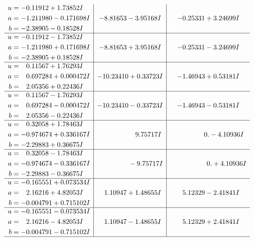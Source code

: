 \documentclass[1p]{elsarticle_modified}
\theoremstyle{definition}
\begin{document}
$$\begin{array}{c|c|c}
\begin{aligned}
u &= -0.11912 + 1.73852 I \\
a &= -1.211980 - 0.171698 I \\
b &= -2.38905 - 0.18528 I\end{aligned}
 & -8.81653 - 3.95168 I & -0.25331 + 3.24699 I \\ \hline\begin{aligned}
u &= -0.11912 - 1.73852 I \\
a &= -1.211980 + 0.171698 I \\
b &= -2.38905 + 0.18528 I\end{aligned}
 & -8.81653 + 3.95168 I & -0.25331 - 3.24699 I \\ \hline\begin{aligned}
u &= \phantom{-}0.11567 + 1.76293 I \\
a &= \phantom{-}0.697284 + 0.000472 I \\
b &= \phantom{-}2.05356 + 0.22436 I\end{aligned}
 & -10.23410 + 0.33723 I & -1.46943 + 0.53181 I \\ \hline\begin{aligned}
u &= \phantom{-}0.11567 - 1.76293 I \\
a &= \phantom{-}0.697284 - 0.000472 I \\
b &= \phantom{-}2.05356 - 0.22436 I\end{aligned}
 & -10.23410 - 0.33723 I & -1.46943 - 0.53181 I \\ \hline\begin{aligned}
u &= \phantom{-}0.32058 + 1.78463 I \\
a &= -0.974674 + 0.336167 I \\
b &= -2.29883 + 0.36675 I\end{aligned}
 & \phantom{-0.000000 -}9.75717 I & \phantom{-0.000000 } 0. - 4.10936 I \\ \hline\begin{aligned}
u &= \phantom{-}0.32058 - 1.78463 I \\
a &= -0.974674 - 0.336167 I \\
b &= -2.29883 - 0.36675 I\end{aligned}
 & \phantom{-0.000000 } -9.75717 I & \phantom{-0.000000 -}0. + 4.10936 I \\ \hline\begin{aligned}
u &= -0.165551 + 0.073534 I \\
a &= \phantom{-}2.16216 + 4.82053 I \\
b &= -0.004791 + 0.715102 I\end{aligned}
 & \phantom{-}1.10947 + 1.48655 I & \phantom{-}5.12329 - 2.41841 I \\ \hline\begin{aligned}
u &= -0.165551 - 0.073534 I \\
a &= \phantom{-}2.16216 - 4.82053 I \\
b &= -0.004791 - 0.715102 I\end{aligned}
 & \phantom{-}1.10947 - 1.48655 I & \phantom{-}5.12329 + 2.41841 I\\
 \hline 
 \end{array}$$\newpage\newpage\renewcommand{\arraystretch}{1}
\end{document}
